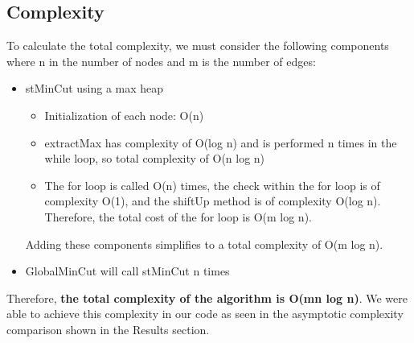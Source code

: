 \subsection{Complexity}
To calculate the total complexity, we must consider the following components where n in the number of nodes and m is the number of edges:
\begin{itemize}
    \item stMinCut using a max heap
    \begin{itemize}
        \item Initialization of each node: O(n)
        \item extractMax has complexity of O(log n) and is performed n times in the while loop, so total complexity of O(n log n)
        \item The for loop is called O(n) times, the check within the for loop is of complexity O(1), and the shiftUp method is of complexity O(log n). Therefore, the total cost of the for loop is O(m log n). 
    \end{itemize}
    Adding these components simplifies to a total complexity of O(m log n).
    \item GlobalMinCut will call stMinCut n times
\end{itemize}
Therefore, \textbf{the total complexity of the algorithm is O(mn log n)}. We were able to achieve this complexity in our code as seen in the asymptotic complexity comparison shown in the Results section.   


\pagebreak